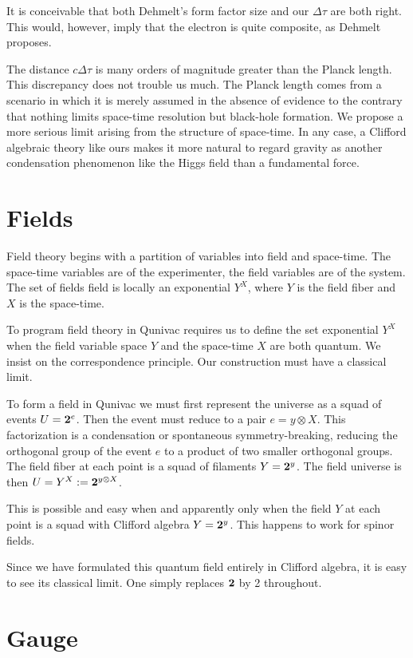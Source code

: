 \documentclass[a4paper,11pt]{article}
\begin{document}
It is conceivable that both Dehmelt's 
form factor size and our $\Delta \tau$ are both right.
This would, however, imply  that the electron
is quite composite,  as Dehmelt proposes.

The distance  $c\Delta \tau$ is many orders of magnitude 
greater than the Planck length.
This discrepancy does not trouble us much.
The Planck length
comes from a scenario
in which it is merely assumed 
in the absence of evidence to the contrary
that nothing limits space-time resolution
but black-hole formation.
We propose a more serious limit
arising from the structure of space-time.
In any case,
a Clifford algebraic theory like ours makes it more natural
to regard gravity as another condensation phenomenon
like the Higgs field
than a fundamental force.


\section{Fields}

Field theory begins with a partition
of variables into field and space-time.
The space-time variables are of the experimenter,
the field variables are of the system.
The set of fields field is locally an exponential $Y^X$,
where $Y$ is the field fiber and $X$ is the space-time.

To program  field theory in Qunivac
requires us to define the set exponential
$Y^X$ when the field variable space $Y$ and the space-time $X$
are both quantum.
We insist on the correspondence principle.
Our construction must have a classical limit.

To form a field in Qunivac we must first represent
the universe as a squad of events $U={\bf 2}^e$.
Then the event must reduce to a pair $e=y\otimes X$.
This factorization is a condensation or spontaneous symmetry-breaking,
reducing the orthogonal group of the event $e$
 to a product of two smaller orthogonal groups.
The field fiber at each point is a squad of filaments $Y={\bf 2}^y$.
The field universe is then $U=Y^X:={\bf 2}^{y\otimes X}$.

This is possible and easy when and apparently only when the 
field   $Y$ at each point  is a squad with Clifford algebra $Y={\bf 2}^y$.
This happens to work for spinor fields.

Since we have formulated this quantum field entirely
in Clifford algebra,
it is easy to see its classical limit.
One simply replaces $\bf 2$ by 2 throughout.


\section{Gauge}
\end{document}

